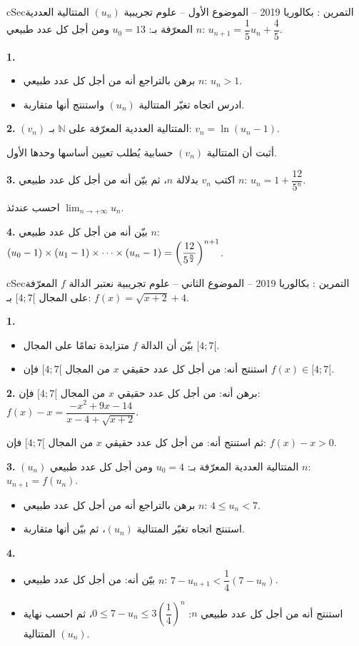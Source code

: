 \documentclass[12pt,a4paper]{article}
\newenvironment{BOX}[2]{\begin{otherlanguage}{english}\begin{arbox}{#1}{#2}}{\end{arbox}\end{otherlanguage}}
\newcounter{exo}
\newenvironment{tamrin}[1]{\stepcounter{exo}\begin{BOX}{cSec}{التمرين \theexo: #1}}{\end{BOX}}
\renewcommand{\cdots}{\mathinner{\cdotp\cdotp\cdotp}}
\newcommand{\N}{\mathbb{N}}
\newcommand{\limn}{\displaystyle\lim_{n\to+\infty}}
\newenvironment{sq}{\begin{itemize}[leftmargin=2.4em,itemsep=3pt]}{\end{itemize}}
\newcommand{\qa}{\item[(أ)]}\newcommand{\qb}{\item[(ب)]}\newcommand{\qc}{\item[(جـ)]}\newcommand{\qd}{\item[(د)]}\newcommand{\qe}{\item[(هـ)]}
\newcommand{\QQ}[1]{\par\smallskip\textbf{#1.} }
\begin{document}
\begin{tamrin}{بكالوريا 2019 -- الموضوع الأول -- علوم تجريبية}
$(u_n)$ المتتالية العددية المعرّفة بـ: $u_0=13$ ومن أجل كل عدد طبيعي $n$: $u_{n+1}=\dfrac{1}{5}u_n+\dfrac{4}{5}$.
\QQ{1}
\begin{sq}
\qa برهن بالتراجع أنه من أجل كل عدد طبيعي $n$: $u_n>1$.
\qb ادرس اتجاه تغيّر المتتالية $(u_n)$ واستنتج أنها متقاربة.
\end{sq}
\QQ{2} $(v_n)$ المتتالية العددية المعرّفة على $\N$ بـ: $v_n=\ln\left(u_n-1\right)$.

أثبت أن المتتالية $(v_n)$ حسابية يُطلب تعيين أساسها وحدها الأول.
\QQ{3} اكتب $v_n$ بدلالة $n$، ثم بيّن أنه من أجل كل عدد طبيعي $n$: $u_n=1+\dfrac{12}{5^n}$.

احسب عندئذ $\limn u_n$.
\QQ{4} بيّن أنه من أجل كل عدد طبيعي $n$: $\left(u_0-1\right)\times\left(u_1-1\right)\times\cdots\times\left(u_n-1\right)=\left(\dfrac{12}{5^{\frac{n}{2}}}\right)^{n+1}$.
\end{tamrin}

\begin{tamrin}{بكالوريا 2019 -- الموضوع الثاني -- علوم تجريبية}
نعتبر الدالة $f$ المعرّفة على المجال $[4;7[$ بـ: $f(x)=\sqrt{x+2}+4$.
\QQ{1}
\begin{sq}
\qa بيّن أن الدالة $f$ متزايدة تمامًا على المجال $[4;7[$.
\qb استنتج أنه: من أجل كل عدد حقيقي $x$ من المجال $[4;7[$ فإن $f(x)\in[4;7[$.
\end{sq}
\QQ{2} برهن أنه: من أجل كل عدد حقيقي $x$ من المجال $[4;7[$ فإن: $f(x)-x=\dfrac{-x^2+9x-14}{x-4+\sqrt{x+2}}$.

ثم استنتج أنه: من أجل كل عدد حقيقي $x$ من المجال $[4;7[$ فإن: $f(x)-x>0$.
\QQ{3} $(u_n)$ المتتالية العددية المعرّفة بـ: $u_0=4$ ومن أجل كل عدد طبيعي $n$: $u_{n+1}=f\left(u_n\right)$.
\begin{sq}
\qa برهن بالتراجع أنه من أجل كل عدد طبيعي $n$: $4\leq u_n<7$.
\qb استنتج اتجاه تغيّر المتتالية $(u_n)$، ثم بيّن أنها متقاربة.
\end{sq}
\QQ{4}
\begin{sq}
\qa بيّن أنه: من أجل كل عدد طبيعي $n$: $7-u_{n+1}<\dfrac{1}{4}\left(7-u_n\right)$.
\qb استنتج أنه من أجل كل عدد طبيعي $n$: $0\leq 7-u_n\leq 3\left(\dfrac{1}{4}\right)^n$، ثم احسب نهاية المتتالية $(u_n)$.
\end{sq}
\end{tamrin}
\end{document}
